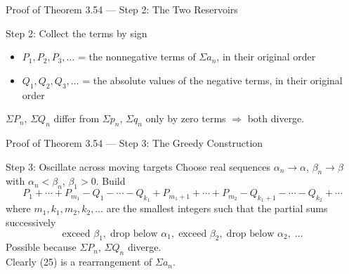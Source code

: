 \documentclass[aspectratio=169,12pt,t]{beamer}
\begin{document}
{\begin{frame}{Proof of Theorem 3.54 --- Step 2: The Two Reservoirs}
  \begin{proofblock}{Step 2: Collect the terms by sign}
    \begin{itemize}
      \item $P_1, P_2, P_3, \dots$ = the \alert{nonnegative} terms of
        $\Sigma a_n$, in their original order
      \item $Q_1, Q_2, Q_3, \dots$ = the \alert{absolute values of the
        negative} terms, in their original order
    \end{itemize}
    $\Sigma P_n$, $\Sigma Q_n$ differ from $\Sigma p_n$, $\Sigma q_n$ only by
    zero terms $\Rightarrow$ both \alert{diverge}.
  \end{proofblock}

\end{frame}

\begin{frame}{Proof of Theorem 3.54 --- Step 3: The Greedy Construction}
  \begin{proofblock}{Step 3: Oscillate across moving targets}
    Choose real sequences $\alpha_n \to \alpha$, $\beta_n \to \beta$ with
    $\alpha_n < \beta_n$, $\beta_1 > 0$. Build
    \begin{equation}
      P_1 + \cdots + P_{m_1} - Q_1 - \cdots - Q_{k_1}
      + P_{m_1+1} + \cdots + P_{m_2} - Q_{k_1+1} - \cdots - Q_{k_2} + \cdots \tag{25}
    \end{equation}
    where $m_1, k_1, m_2, k_2, \dots$ are the \alert{smallest} integers such
    that the partial sums successively
    \[
      \text{exceed } \beta_1, \;\text{drop below } \alpha_1, \;
      \text{exceed } \beta_2, \;\text{drop below } \alpha_2, \;\dots
    \]
    Possible because $\Sigma P_n$, $\Sigma Q_n$ \alert{diverge}.\\
    Clearly (25) is a rearrangement of $\Sigma a_n$.
  \end{proofblock}


\end{frame}}
\end{document}
